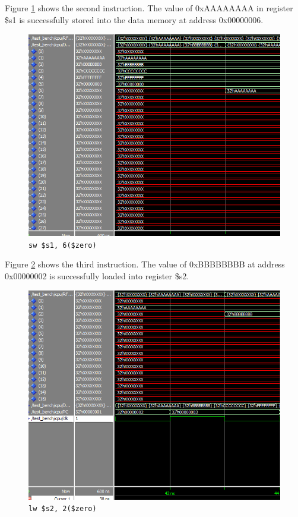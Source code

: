 \documentclass[12pt]{article}
\begin{document}
Figure \ref{fig:2-instr} shows the second instruction. The value of 0xAAAAAAAA in register \$s1 is successfully stored into the data memory at address 0x00000006.
\begin{figure}[H]
\centering
\includegraphics[width=\linewidth]{simulation/2-instr}
\caption{\texttt{sw \$s1, 6(\$zero)}}
\label{fig:2-instr}
\end{figure}

Figure \ref{fig:3-instr} shows the third instruction. The value of 0xBBBBBBBB at address 0x00000002 is successfully loaded into register \$s2.
\begin{figure}[H]
\centering
\includegraphics[width=\linewidth]{simulation/3-instr}
\caption{\texttt{lw \$s2, 2(\$zero)}}
\label{fig:3-instr}
\end{figure}
\end{document}
